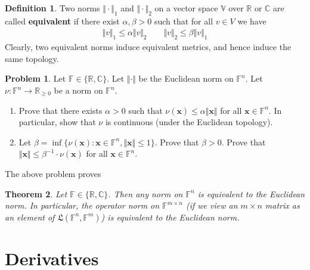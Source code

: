 \documentclass[12pt,b5paper,notitlepage]{article}
\theoremstyle{definition}
\newtheorem{df}{Definition}[section]
\newtheorem{prob}{\color{red}Problem}[section]
\theoremstyle{plain}
\newtheorem{thm}[df]{Theorem}
\newcommand{\fk}{\mathfrak}
\newcommand{\mbf}{\mathbf}
\newcommand{\Vbb}{\mathbb V}
\newcommand{\Cbb}{\mathbb C}
\newcommand{\Rbb}{\mathbb R}
\newcommand{\Fbb}{\mathbb F}
\numberwithin{equation}{section}
\begin{document}
\begin{df}
Two norms $\Vert\cdot\Vert_1$ and $\Vert\cdot\Vert_2$ on a vector space $\Vbb$ over $\Rbb$ or $\Cbb$ are called \textbf{equivalent}  if there exist $\alpha,\beta>0$ such that for all $v\in V$ we have
\begin{align*}
\Vert v\Vert_1\leq \alpha \Vert v\Vert_2\qquad \Vert v\Vert_2\leq \beta \Vert v\Vert_1
\end{align*}
Clearly, two equivalent norms induce equivalent metrics, and hence induce the same topology.
\end{df}


\begin{prob}
Let $\Fbb\in\{\Rbb,\Cbb\}$. Let $\Vert\cdot\Vert$ be the Euclidean norm on $\Fbb^n$. Let $\nu:\Fbb^n\rightarrow\Rbb_{\geq 0}$ be a norm on $\Fbb^n$.
\begin{enumerate}
\item Prove that there exists $\alpha>0$ such that $\nu(\mbf x)\leq \alpha\Vert\mbf x\Vert$ for all $\mbf x\in\Fbb^n$. In particular, show that $\nu$ is continuous (under the Euclidean topology).
\item Let $\beta=\inf\{\nu(\mbf x):\mbf x\in\Fbb^n,\Vert \mbf x\Vert\leq 1\}$. Prove that $\beta>0$. Prove that $\Vert \mbf x\Vert\leq\beta^{-1}\cdot\nu(\mbf x)$ for all $\mbf x\in\Fbb^n$.
\end{enumerate}
\end{prob}


The above problem proves

\begin{thm}\label{lb363}
Let $\Fbb\in\{\Rbb,\Cbb\}$. Then any norm on $\Fbb^n$ is equivalent to the Euclidean norm. In particular, the operator norm on $\Fbb^{m\times n}$ (if we view an $m\times n$ matrix as an element of $\fk L(\Fbb^n,\Fbb^m)$) is equivalent to the Euclidean norm.
\end{thm}













\newpage







\section{Derivatives}
\end{document}
